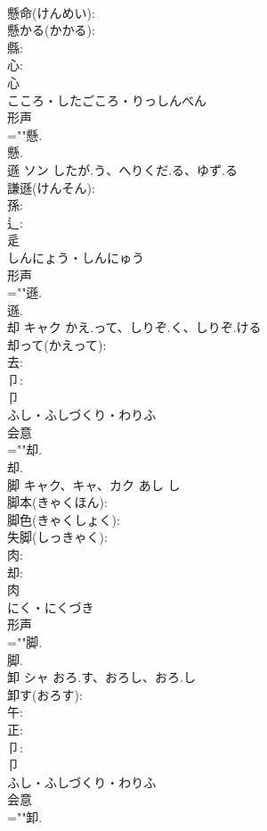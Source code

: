 \documentclass[8pt]{extreport}
\begin{document}
\begin{CJK}{UTF8}{min}
\\	懸命(けんめい): 
\\	懸かる(かかる): 
\\	縣: 
\\	心: 
\\	心	
\\	こころ・したごころ・りっしんべん	
\\	形声 
\\	=""懸.
\\	懸.
\\	遜	ソン	したが.う、へりくだ.る、ゆず.る		
\\	謙遜(けんそん): 
\\	孫: 
\\	辶: 
\\	辵	
\\	しんにょう・しんにゅう	
\\	形声 
\\	=""遜.
\\	遜.
\\	却	キャク	かえ.って、しりぞ.く、しりぞ.ける		
\\	却って(かえって): 
\\	去: 
\\	卩: 
\\	卩	
\\	ふし・ふしづくり・わりふ	
\\	会意 
\\	=""却.
\\	却.
\\	脚	キャク、キャ、カク	あし	し	
\\	脚本(きゃくほん): 
\\	脚色(きゃくしょく): 
\\	失脚(しっきゃく): 
\\	肉: 
\\	却: 
\\	肉	
\\	にく・にくづき	
\\	形声 
\\	=""脚.
\\	脚.
\\	卸	シャ	おろ.す、おろし、おろ.し		
\\	卸す(おろす): 
\\	午: 
\\	正: 
\\	卩: 
\\	卩	
\\	ふし・ふしづくり・わりふ	
\\	会意 
\\	=""卸.

\end{CJK}
\end{document}
